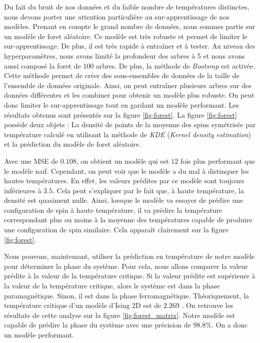 \documentclass[11pt, parskip=half]{scrartcl} %
\begin{document}
Du fait du bruit de nos données et du faible nombre de températures distinctes, nous devons porter une attention particulière au sur-apprentissage de nos modèles.
Prenant en compte le grand nombre de données, nous sommes partis sur un modèle de foret aléatoire. Ce modèle est très robuste et permet de limiter le sur-apprentissage. De plus, il est très rapide à entraîner et à tester.
Au niveau des hyperparamètres, nous avons limité la profondeur des arbres à 5 et nous avons aussi composé la foret de $100$ arbres. De plus, la méthode de \textit{Bootsrap} est activée. Cette méthode permet de créer des sous-ensembles de données de la taille de l'ensemble de données originale. Ainsi, on peut entraîner plusieurs arbres sur des données différentes et les combiner pour obtenir un modèle plus robuste.
On peut donc limiter le sur-apprentissage tout en gardant un modèle performant. Les résultats obtenus sont présentés sur la figure \ref{fig:forest}.
La figure \ref{fig:forest} possède deux objets : La densité de points de la moyenne des spins symétrisée par température calculé en utilisant la méthode de \textit{KDE} (\textit{Kernel density estimation}) et la prédiction du modèle de foret aléatoire.

Avec une MSE de $0.108$, on obtient un modèle qui est $12$ fois plus performant que le modèle naif. Cependant, on peut voir que le modèle a du mal à distinquer les hautes températures. En effet, les valeurs prédites par ce modèle sont toujours inférieures à $3.5$.
Cela peut s'expliquer par le fait que, à haute température, la densité est quasiment nulle. Ainsi, lorsque le modèle va essayer de prédire une configuration de spin à haute température, il va prédire la température correspondant plus ou moins à la moyenne des températures capable de produire une configuration de spin similaire. Cela apparaît clairement sur la figure \ref{fig:forest}.

Nous pouvons, maintemant, utiliser la prédiction en température de notre modèle pour déterminer la phase du système. Pour cela, nous allons comparer la valeur prédite à la valeur de la température critique. Si la valeur prédite est supérieure à la valeur de la température critique, alors le système est dans la phase paramagnétique. Sinon, il est dans la phase ferromagnétique.
Théoriquement, la température critique d'un modèle d'Ising 2D est de $2.269$ \cite{aviles_critical_2023}. On retrouve les résultats de cette analyse sur la figure \ref{fig:forest_matrix}.  Notre modèle est capable de prédire la phase du système avec une précision de $98.8\%$. On a donc un modèle performant.
\end{document}
